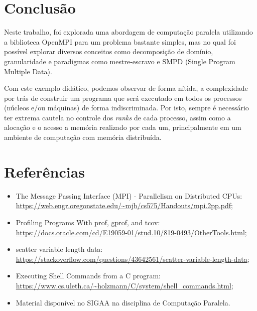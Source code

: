 \documentclass[a4paper, 12pt]{article}
\begin{document}

\section{Conclusão}

Neste trabalho, foi explorada uma abordagem de computação paralela utilizando a biblioteca OpenMPI para um problema bastante simples, mas no qual foi possível explorar diversos conceitos como decomposição de domínio, granularidade e paradigmas como mestre-escravo e SMPD (Single Program Multiple Data).

Com este exemplo didático, podemos observar de forma nítida, a complexidade por trás de construir um programa que será executado em todos os processos (núcleos e/ou máquinas) de forma indiscriminada. Por isto, sempre é necessário ter extrema cautela no controle dos \emph{ranks} de cada processo, assim como a alocação e o acesso a memória realizado por cada um, principalmente em um ambiente de computação com memória distribuída.

\section*{Referências}

\begin{itemize}
    \item The Message Passing Interface (MPI) - Parallelism on Distributed CPUs: \url{https://web.engr.oregonstate.edu/~mjb/cs575/Handouts/mpi.2pp.pdf};
    \item Profiling Programs With prof, gprof, and tcov: \url{https://docs.oracle.com/cd/E19059-01/stud.10/819-0493/OtherTools.html};
    \item scatter variable length data: \url{https://stackoverflow.com/questions/43642561/scatter-variable-length-data};
    \item Executing Shell Commands from a C program: \url{https://www.cs.uleth.ca/~holzmann/C/system/shell_commands.html};
    \item Material disponível no SIGAA na disciplina de Computação Paralela.
\end{itemize}
\end{document}
